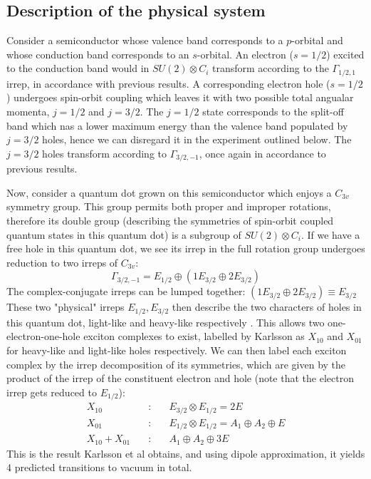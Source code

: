 \documentclass[12pt]{article}
\begin{document}
	\subsection{Description of the physical system}
	Consider a semiconductor whose valence band corresponds to a $p$-orbital and whose conduction band corresponds to an $s$-orbital. An electron ($s=1/2$) excited to the conduction band would in $SU(2)\otimes C_i$ transform according to the $\Gamma_{1/2,1}$ irrep, in accordance with previous results. A corresponding electron hole ($s=1/2$) undergoes spin-orbit coupling which leaves it with two possible total angualar momenta, $j=1/2$ and $j=3/2$. The $j=1/2$ state corresponds to the split-off band which nas a lower maximum energy than the valence band populated by $j=3/2$ holes, hence we can disregard it in the experiment outlined below. The $j=3/2$ holes transform according to $\Gamma_{3/2,-1}$, once again in accordance to previous results.
	
	Now, consider a quantum dot grown on this semiconductor which enjoys a $C_{3v}$ symmetry group. This group permits both proper and improper rotations, therefore its double group (describing the symmetries of spin-orbit coupled quantum states in this quantum dot) is a subgroup of $SU(2)\otimes C_i$. If we have a free hole in this quantum dot, we see its irrep in the full rotation group undergoes reduction to two irreps of $C_{3v}$:
	$$\Gamma_{3/2,-1}=E_{1/2}\oplus (1E_{3/2}\oplus 2E_{3/2})$$
	The complex-conjugate irreps can be lumped together: $(1E_{3/2}\oplus 2E_{3/2})\equiv E_{3/2}$
	These two "physical" irreps $E_{1/2}, E_{3/2}$ then describe the two characters of holes in this quantum dot, light-like and heavy-like respectively \cite{karlsson}. This allows two one-electron-one-hole exciton complexes to exist, labelled by Karlsson as $X_{10}$ and $X_{01}$ for heavy-like and light-like holes respectively. We can then label each exciton complex by the irrep decomposition of its symmetries, which are given by the product of the irrep of the constituent electron and hole (note that the electron irrep gets reduced to $E_{1/2}$):
	\begin{eqnarray*}
	X_{10}\quad &:& \quad E_{3/2} \otimes E_{1/2} = 2E\\
	X_{01}\quad &:& \quad E_{1/2} \otimes E_{1/2} = A_1 \oplus A_2 \oplus E\\
	X_{10} + X_{01} \quad &:& \quad A_1 \oplus A_2 \oplus 3E
	\end{eqnarray*}
	This is the result Karlsson et al obtains, and using dipole approximation, it yields 4 predicted transitions to vacuum in total.
\end{document}
